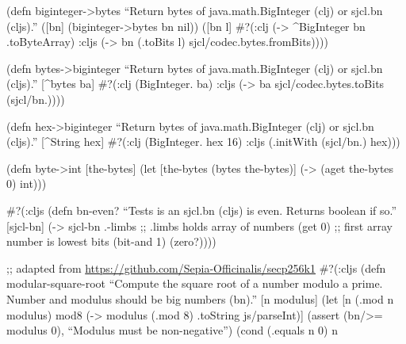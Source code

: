 \documentclass[
]{article}
\begin{document}
(defn biginteger-\textgreater bytes ``Return bytes of
java.math.BigInteger (clj) or sjcl.bn (cljs).'' ({[}bn{]}
(biginteger-\textgreater bytes bn nil)) ({[}bn l{]} \#?(:clj
(-\textgreater{} \^{}BigInteger bn .toByteArray) :cljs (-\textgreater{}
bn (.toBits l) sjcl/codec.bytes.fromBits))))

(defn bytes-\textgreater biginteger ``Return bytes of
java.math.BigInteger (clj) or sjcl.bn (cljs).'' {[}\^{}bytes ba{]}
\#?(:clj (BigInteger. ba) :cljs (-\textgreater{} ba
sjcl/codec.bytes.toBits (sjcl/bn.))))

(defn hex-\textgreater biginteger ``Return bytes of java.math.BigInteger
(clj) or sjcl.bn (cljs).'' {[}\^{}String hex{]} \#?(:clj (BigInteger.
hex 16) :cljs (.initWith (sjcl/bn.) hex)))

(defn byte-\textgreater int {[}the-bytes{]} (let {[}the-bytes (bytes
the-bytes){]} (-\textgreater{} (aget the-bytes 0) int)))

\#?(:cljs (defn bn-even? ``Tests is an sjcl.bn (cljs) is even. Returns
boolean if so.'' {[}sjcl-bn{]} (-\textgreater{} sjcl-bn .-limbs ;;
.limbs holds array of numbers (get 0) ;; first array number is lowest
bits (bit-and 1) (zero?))))

;; adapted from \url{https://github.com/Sepia-Officinalis/secp256k1}
\#?(:cljs (defn modular-square-root ``Compute the square root of a
number modulo a prime. Number and modulus should be big numbers (bn).''
{[}n modulus{]} (let {[}n (.mod n modulus) mod8 (-\textgreater{} modulus
(.mod 8) .toString js/parseInt){]} (assert (bn/\textgreater= modulus 0),
``Modulus must be non-negative'') (cond (.equals n 0) n
\end{document}
